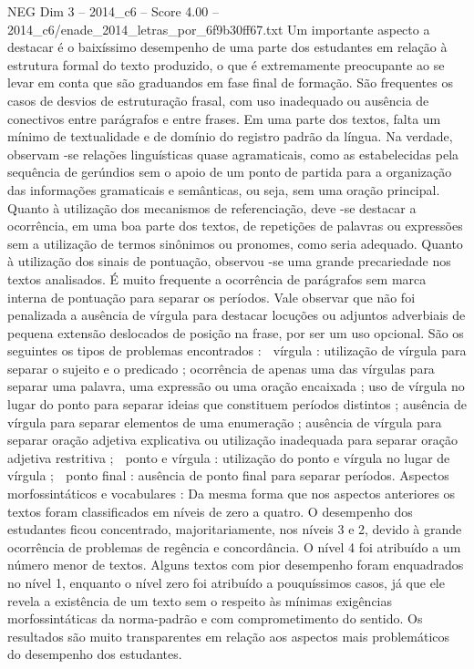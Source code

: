 \begin{textsample}{NEG Dim 3 – 2014\_c6 – Score 4.00 – 2014\_c6/enade\_2014\_letras\_por\_6f9b30ff67.txt}
Um importante aspecto a destacar é o baixíssimo desempenho de uma parte dos estudantes em relação à estrutura formal do texto produzido, o que é extremamente preocupante ao se levar em conta que são graduandos em fase final de formação.
São frequentes os casos de desvios de estruturação frasal, com uso inadequado ou ausência de conectivos entre parágrafos e entre frases.
Em uma parte dos textos, falta um mínimo de textualidade e de domínio do registro padrão da língua.
Na verdade, observam -se relações linguísticas quase agramaticais, como as estabelecidas pela sequência de gerúndios sem o apoio de um ponto de partida para a organização das informações gramaticais e semânticas, ou seja, sem uma oração principal.
Quanto à utilização dos mecanismos de referenciação, deve -se destacar a ocorrência, em uma boa parte dos textos, de repetições de palavras ou expressões sem a utilização de termos sinônimos ou pronomes, como seria adequado.
Quanto à utilização dos sinais de pontuação, observou -se uma grande precariedade nos textos analisados.
É muito frequente a ocorrência de parágrafos sem marca interna de pontuação para separar os períodos.
Vale observar que não foi penalizada a ausência de vírgula para destacar locuções ou adjuntos adverbiais de pequena extensão deslocados de posição na frase, por ser um uso opcional.
São os seguintes os tipos de problemas encontrados :  vírgula : utilização de vírgula para separar o sujeito e o predicado ; ocorrência de apenas uma das vírgulas para separar uma palavra, uma expressão ou uma oração encaixada ; uso de vírgula no lugar do ponto para separar ideias que constituem períodos distintos ; ausência de vírgula para separar elementos de uma enumeração ; ausência de vírgula para  separar oração adjetiva explicativa ou utilização inadequada para separar oração adjetiva restritiva ;  ponto e vírgula : utilização do ponto e vírgula no lugar de vírgula ;  ponto final : ausência de ponto final para separar períodos.
Aspectos morfossintáticos e vocabulares : Da mesma forma que nos aspectos anteriores os textos foram classificados em níveis de zero a quatro.
O desempenho dos estudantes ficou concentrado, majoritariamente, nos níveis 3 e 2, devido à grande ocorrência de problemas de regência e concordância.
O nível 4 foi atribuído a um número menor de textos.
Alguns textos com pior desempenho foram enquadrados no nível 1, enquanto o nível zero foi atribuído a pouquíssimos casos, já que ele revela a existência de um texto sem o respeito às mínimas exigências morfossintáticas da norma-padrão e com comprometimento do sentido.
Os resultados são muito transparentes em relação aos aspectos mais problemáticos do desempenho dos estudantes.

\end{textsample}
